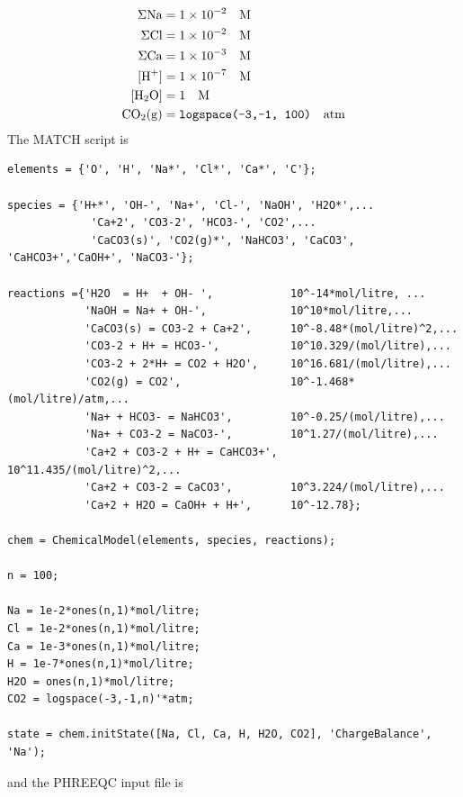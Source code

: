 \documentclass{article}
\begin{document}
\begin{align}
\Sigma \ce{Na} &= 1\times10^{-2} \quad\text{M}\\
\Sigma \ce{Cl} &= 1\times10^{-2} \quad\text{M}\\
\Sigma \ce{Ca} &= 1\times10^{-3} \quad\text{M}\\
[\ce{H+}] &=  1\times10^{-7} \quad\text{M}\\
[\ce{H2O}] & = 1 \quad\text{M}\\
\ce{CO2(g)} &= \texttt{logspace(-3,-1, 100)} \quad\text{atm}\\
\end{align}
The MATCH script is

\begin{lstlisting}
elements = {'O', 'H', 'Na*', 'Cl*', 'Ca*', 'C'};

species = {'H+*', 'OH-', 'Na+', 'Cl-', 'NaOH', 'H2O*',...
             'Ca+2', 'CO3-2', 'HCO3-', 'CO2',...
             'CaCO3(s)', 'CO2(g)*', 'NaHCO3', 'CaCO3', 'CaHCO3+','CaOH+', 'NaCO3-'};

reactions ={'H2O  = H+  + OH- ',            10^-14*mol/litre, ...
            'NaOH = Na+ + OH-',             10^10*mol/litre,...
            'CaCO3(s) = CO3-2 + Ca+2',      10^-8.48*(mol/litre)^2,...
            'CO3-2 + H+ = HCO3-',           10^10.329/(mol/litre),...
            'CO3-2 + 2*H+ = CO2 + H2O',     10^16.681/(mol/litre),...
            'CO2(g) = CO2',                 10^-1.468*(mol/litre)/atm,...
            'Na+ + HCO3- = NaHCO3',         10^-0.25/(mol/litre),...
            'Na+ + CO3-2 = NaCO3-',         10^1.27/(mol/litre),...
            'Ca+2 + CO3-2 + H+ = CaHCO3+',  10^11.435/(mol/litre)^2,...
            'Ca+2 + CO3-2 = CaCO3',         10^3.224/(mol/litre),...
            'Ca+2 + H2O = CaOH+ + H+',      10^-12.78};

chem = ChemicalModel(elements, species, reactions);

n = 100;

Na = 1e-2*ones(n,1)*mol/litre;
Cl = 1e-2*ones(n,1)*mol/litre;
Ca = 1e-3*ones(n,1)*mol/litre;
H = 1e-7*ones(n,1)*mol/litre;
H2O = ones(n,1)*mol/litre;
CO2 = logspace(-3,-1,n)'*atm;

state = chem.initState([Na, Cl, Ca, H, H2O, CO2], 'ChargeBalance', 'Na');
\end{lstlisting}
and the PHREEQC input file is
\end{document}
